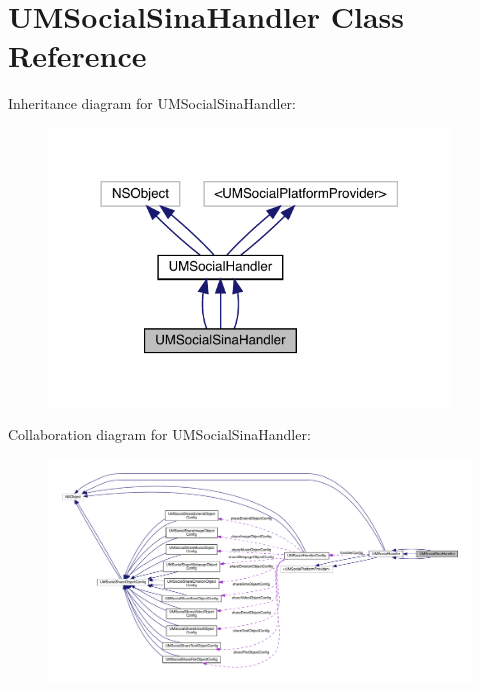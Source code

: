\hypertarget{interface_u_m_social_sina_handler}{}\section{U\+M\+Social\+Sina\+Handler Class Reference}
\label{interface_u_m_social_sina_handler}


Inheritance diagram for U\+M\+Social\+Sina\+Handler\+:\nopagebreak
\begin{figure}[H]
\begin{center}
\leavevmode
\includegraphics[width=302pt]{interface_u_m_social_sina_handler__inherit__graph}
\end{center}
\end{figure}


Collaboration diagram for U\+M\+Social\+Sina\+Handler\+:\nopagebreak
\begin{figure}[H]
\begin{center}
\leavevmode
\includegraphics[width=350pt]{interface_u_m_social_sina_handler__coll__graph}
\end{center}
\end{figure}
